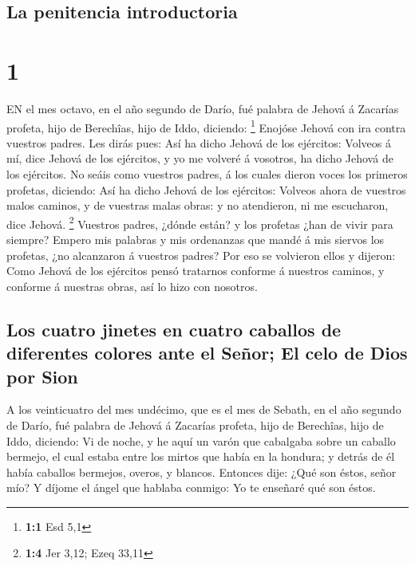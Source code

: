 \hypertarget{la-penitencia-introductoria}{%
\subsection{La penitencia
introductoria}\label{la-penitencia-introductoria}}

\hypertarget{section}{%
\section{1}\label{section}}

 EN el mes octavo, en el año segundo de Darío, fué palabra
de Jehová á Zacarías profeta, hijo de Berechîas, hijo de Iddo, diciendo:
\footnote{\textbf{1:1} Esd 5,1}  Enojóse Jehová con ira
contra vuestros padres.  Les dirás pues: Así ha dicho Jehová
de los ejércitos: Volveos á mí, dice Jehová de los ejércitos, y yo me
volveré á vosotros, ha dicho Jehová de los ejércitos.  No
seáis como vuestros padres, á los cuales dieron voces los primeros
profetas, diciendo: Así ha dicho Jehová de los ejércitos: Volveos ahora
de vuestros malos caminos, y de vuestras malas obras: y no atendieron,
ni me escucharon, dice Jehová. \footnote{\textbf{1:4} Jer 3,12; Ezeq
  33,11}  Vuestros padres, ¿dónde están? y los profetas ¿han
de vivir para siempre?  Empero mis palabras y mis ordenanzas
que mandé á mis siervos los profetas, ¿no alcanzaron á vuestros padres?
Por eso se volvieron ellos y dijeron: Como Jehová de los ejércitos pensó
tratarnos conforme á nuestros caminos, y conforme á nuestras obras, así
lo hizo con nosotros.

\hypertarget{los-cuatro-jinetes-en-cuatro-caballos-de-diferentes-colores-ante-el-seuxf1or-el-celo-de-dios-por-sion}{%
\subsection{Los cuatro jinetes en cuatro caballos de diferentes colores
ante el Señor; El celo de Dios por
Sion}\label{los-cuatro-jinetes-en-cuatro-caballos-de-diferentes-colores-ante-el-seuxf1or-el-celo-de-dios-por-sion}}

 A los veinticuatro del mes undécimo, que es el mes de
Sebath, en el año segundo de Darío, fué palabra de Jehová á Zacarías
profeta, hijo de Berechîas, hijo de Iddo, diciendo:  Vi de
noche, y he aquí un varón que cabalgaba sobre un caballo bermejo, el
cual estaba entre los mirtos que había en la hondura; y detrás de él
había caballos bermejos, overos, y blancos.  Entonces dije:
¿Qué son éstos, señor mío? Y díjome el ángel que hablaba conmigo: Yo te
enseñaré qué son éstos.

